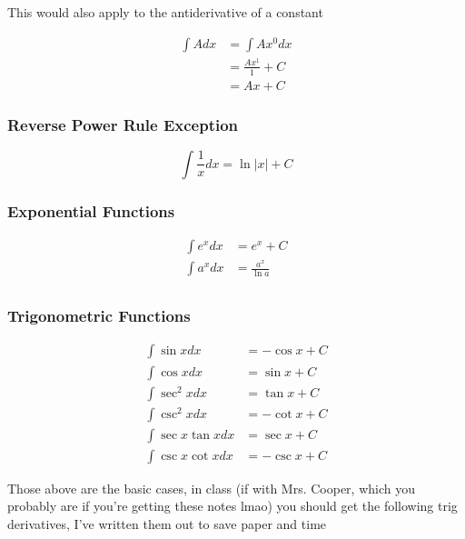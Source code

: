 \documentclass[12pt]{article}
\begin{document}
        \noindent This would also apply to the antiderivative of a constant

        \[
            \begin{aligned}
                \int A dx &= \int Ax^0 dx\\ 
                &= \frac{Ax^1}{1} + C \\
                &= Ax + C
            \end{aligned}   
        \]

        \subsubsection{Reverse Power Rule Exception}

        \[
            \int \frac{1}{x} dx = \ln \left|x\right| + C   
        \]

        \subsubsection{Exponential Functions}

        \[
            \begin{aligned}
                \int e^x dx &= e^x + C\\
                \int a^x dx &= \frac{a^x}{\ln a}\\
            \end{aligned}
        \]

        \subsubsection{Trigonometric Functions}

        \[
            \begin{aligned}
                \int\sin x dx &= -\cos x + C\\
                \int\cos x dx &= \sin x + C\\
                \int\sec^2 x dx &= \tan x + C\\
                \int\csc^2 x dx &= -\cot x + C\\
                \int\sec x \tan x dx &= \sec x + C\\
                \int\csc x \cot x dx &= -\csc x + C 
            \end{aligned}    
        \]

        Those above are the basic cases, in class (if with Mrs. Cooper, which you probably are if you're getting these notes lmao) 
        you should get the following trig derivatives, I've written them out to save paper and time
\end{document}
